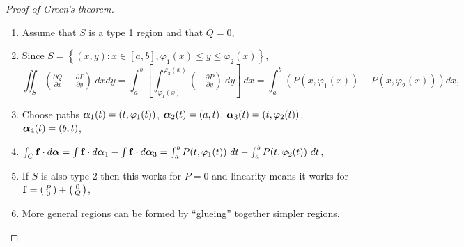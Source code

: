 \begin{proof}[Proof of Green's theorem]
    \begin{enumerate}
        \item Assume that \(S\) is a type 1 region and that \(Q=0\),
        \item Since \(S = \left\{(x,y): x \in [a,b], \varphi_1(x) \leq y \leq \varphi_2(x)\right\}\),
              \[
                  \iint_{S}  \left(\tfrac{\partial Q}{\partial x} - \tfrac{\partial P}{\partial y}\right) \ dxdy =
                  \int_{a}^{b}\left[\int_{\varphi_1(x)}^{\varphi_2(x)}  (- \tfrac{\partial P}{\partial y}) \ dy\right] \ dx
                  = \int_{a}^{b}  (P(x,\varphi_1(x))-P(x,\varphi_2(x)))   dx,
              \]
        \item Choose paths \(\boldsymbol{\alpha}_1(t) = (t,\varphi_1(t))\), \(\boldsymbol{\alpha}_2(t) = (a,t)\), \(\boldsymbol{\alpha}_3(t) = (t,\varphi_2(t))\), \(\boldsymbol{\alpha}_4(t) = (b,t)\),
        \item \(\int_{C} \ff \cdot d\aalpha = \int \ff \cdot d\aalpha_1 - \int \ff \cdot d\aalpha_3 = \int_{a}^{b} P(t,\varphi_1(t)) \ dt -  \int_{a}^{b} P(t,\varphi_2(t)) \ dt \),
        \item If \(S\) is also type 2 then this works for \(P=0\) and linearity means it works for \(\mathbf{f} = \left(\begin{smallmatrix}
                  P \\ 0
              \end{smallmatrix}\right)+\left(\begin{smallmatrix}
                  0 \\ Q
              \end{smallmatrix}\right)\),
        \item More general regions can be formed by ``glueing'' together simpler regions.
    \end{enumerate}
\end{proof}




